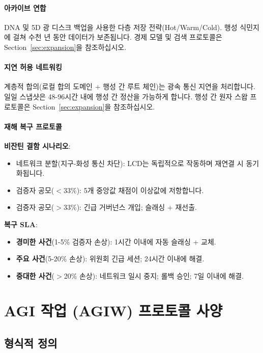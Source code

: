 \documentclass[11pt]{article}
\begin{document}
\paragraph{아카이브 연합}
DNA 및 5D 광 디스크 백업을 사용한 다층 저장 전략(Hot/Warm/Cold). 행성 식민지에 걸쳐 수천 년 동안 데이터가 보존됩니다. 경제 모델 및 검색 프로토콜은 Section~\ref{sec:expansion}을 참조하십시오.

\paragraph{지연 허용 네트워킹}
계층적 합의(로컬 합의 도메인 + 행성 간 루트 체인)는 광속 통신 지연을 처리합니다. 일일 스냅샷은 48-96시간 내에 행성 간 정산을 가능하게 합니다. 행성 간 원자 스왑 프로토콜은 Section~\ref{sec:expansion}을 참조하십시오.

\paragraph{재해 복구 프로토콜}
\textbf{비잔틴 결함 시나리오}:
\begin{itemize}[noitemsep]
  \item 네트워크 분할(지구-화성 통신 차단): LCD는 독립적으로 작동하며 재연결 시 동기화됩니다.
  \item 검증자 공모($<$33\%): 5개 중앙값 채점이 이상값에 저항합니다.
  \item 검증자 공모($>$33\%): 긴급 거버넌스 개입; 슬래싱 + 재선출.
\end{itemize}

\textbf{복구 SLA}:
\begin{itemize}[noitemsep]
  \item \textbf{경미한 사건}(1-5\% 검증자 손상): 1시간 이내에 자동 슬래싱 + 교체.
  \item \textbf{주요 사건}(5-20\% 손상): 위원회 긴급 세션; 24시간 이내에 해결.
  \item \textbf{중대한 사건}($>$20\% 손상): 네트워크 일시 중지; 롤백 승인; 7일 이내에 해결.
\end{itemize}

\section{AGI 작업 (AGIW) 프로토콜 사양}
\label{sec:agiw-spec}

\subsection{형식적 정의}
\end{document}
